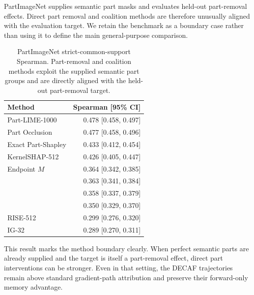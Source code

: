 PartImageNet supplies semantic part masks and evaluates held-out part-removal effects. Direct part removal and coalition methods are therefore unusually aligned with the evaluation target. We retain the benchmark as a boundary case rather than using it to define the main general-purpose comparison.

\begin{table}[!tb]
\centering
\caption{PartImageNet strict-common-support Spearman. Part-removal and coalition methods exploit the supplied semantic part groups and are directly aligned with the held-out part-removal target.}
\label{tab:partimagenet-boundary}
\footnotesize
\setlength{\tabcolsep}{4pt}
\begin{tabular}{lr}
\toprule
Method & Spearman [95\% CI] \\
\midrule
Part-LIME-1000 & 0.478 [0.458, 0.497] \\
Part Occlusion & 0.477 [0.458, 0.496] \\
Exact Part-Shapley & 0.433 [0.412, 0.454] \\
KernelSHAP-512 & 0.426 [0.405, 0.447] \\
Endpoint $M$ & 0.364 [0.342, 0.385] \\
\decaf-9 & 0.363 [0.341, 0.384] \\
\decaf-5 & 0.358 [0.337, 0.379] \\
\decaf-3 & 0.350 [0.329, 0.370] \\
RISE-512 & 0.299 [0.276, 0.320] \\
IG-32 & 0.289 [0.270, 0.311] \\
\bottomrule
\end{tabular}
\end{table}

This result marks the method boundary clearly. When perfect semantic parts are already supplied and the target is itself a part-removal effect, direct part interventions can be stronger. Even in that setting, the DECAF trajectories remain above standard gradient-path attribution and preserve their forward-only memory advantage.
